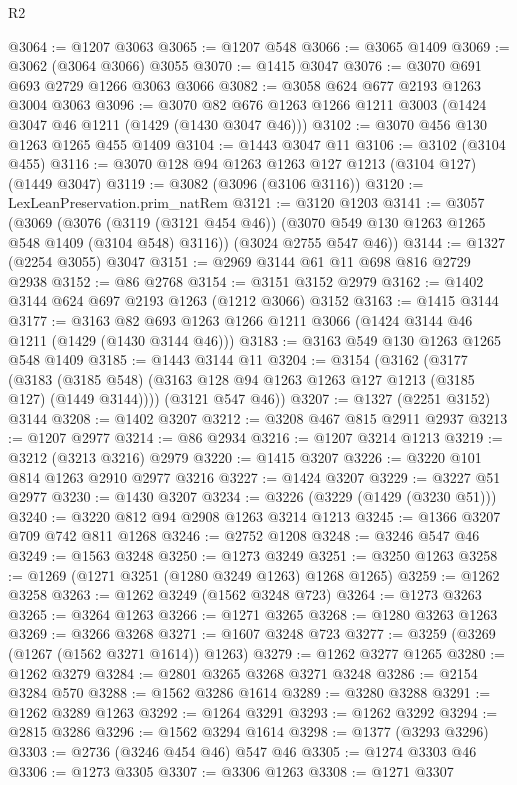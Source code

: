 \begin{lexlean}{R2}
\begin{coremodule}
@3064 := @1207 @3063
@3065 := @1207 @548
@3066 := @3065 @1409
@3069 := @3062 (@3064 @3066) @3055
@3070 := @1415 @3047
@3076 := @3070 @691 @693 @2729 @1266 @3063 @3066
@3082 := @3058 @624 @677 @2193 @1263 @3004 @3063
@3096 := @3070 @82 @676 @1263 @1266 @1211 @3003 (@1424 @3047 @46 @1211 (@1429 (@1430 @3047 @46)))
@3102 := @3070 @456 @130 @1263 @1265 @455 @1409
@3104 := @1443 @3047 @11
@3106 := @3102 (@3104 @455)
@3116 := @3070 @128 @94 @1263 @1263 @127 @1213 (@3104 @127) (@1449 @3047)
@3119 := @3082 (@3096 (@3106 @3116))
@3120 := LexLeanPreservation.prim_natRem
@3121 := @3120 @1203
@3141 := @3057
    (@3069
      (@3076 (@3119 (@3121 @454 @46)) (@3070 @549 @130 @1263 @1265 @548 @1409 (@3104 @548) @3116))
      (@3024 @2755 @547 @46))
@3144 := @1327 (@2254 @3055) @3047
@3151 := @2969 @3144 @61 @11 @698 @816 @2729 @2938
@3152 := @86 @2768
@3154 := @3151 @3152 @2979
@3162 := @1402 @3144 @624 @697 @2193 @1263 (@1212 @3066) @3152
@3163 := @1415 @3144
@3177 := @3163 @82 @693 @1263 @1266 @1211 @3066 (@1424 @3144 @46 @1211 (@1429 (@1430 @3144 @46)))
@3183 := @3163 @549 @130 @1263 @1265 @548 @1409
@3185 := @1443 @3144 @11
@3204 := @3154
    (@3162
      (@3177
        (@3183 (@3185 @548) (@3163 @128 @94 @1263 @1263 @127 @1213 (@3185 @127) (@1449 @3144))))
      (@3121 @547 @46))
@3207 := @1327 (@2251 @3152) @3144
@3208 := @1402 @3207
@3212 := @3208 @467 @815 @2911 @2937
@3213 := @1207 @2977
@3214 := @86 @2934
@3216 := @1207 @3214 @1213
@3219 := @3212 (@3213 @3216) @2979
@3220 := @1415 @3207
@3226 := @3220 @101 @814 @1263 @2910 @2977 @3216
@3227 := @1424 @3207
@3229 := @3227 @51 @2977
@3230 := @1430 @3207
@3234 := @3226 (@3229 (@1429 (@3230 @51)))
@3240 := @3220 @812 @94 @2908 @1263 @3214 @1213
@3245 := @1366 @3207 @709 @742 @811 @1268
@3246 := @2752 @1208
@3248 := @3246 @547 @46
@3249 := @1563 @3248
@3250 := @1273 @3249
@3251 := @3250 @1263
@3258 := @1269 (@1271 @3251 (@1280 @3249 @1263) @1268 @1265)
@3259 := @1262 @3258
@3263 := @1262 @3249 (@1562 @3248 @723)
@3264 := @1273 @3263
@3265 := @3264 @1263
@3266 := @1271 @3265
@3268 := @1280 @3263 @1263
@3269 := @3266 @3268
@3271 := @1607 @3248 @723
@3277 := @3259 (@3269 (@1267 (@1562 @3271 @1614)) @1263)
@3279 := @1262 @3277 @1265
@3280 := @1262 @3279
@3284 := @2801 @3265 @3268 @3271 @3248
@3286 := @2154 @3284 @570
@3288 := @1562 @3286 @1614
@3289 := @3280 @3288
@3291 := @1262 @3289 @1263
@3292 := @1264 @3291
@3293 := @1262 @3292
@3294 := @2815 @3286
@3296 := @1562 @3294 @1614
@3298 := @1377 (@3293 @3296)
@3303 := @2736 (@3246 @454 @46) @547 @46
@3305 := @1274 @3303 @46
@3306 := @1273 @3305
@3307 := @3306 @1263
@3308 := @1271 @3307

\end{coremodule}
\end{lexlean}

